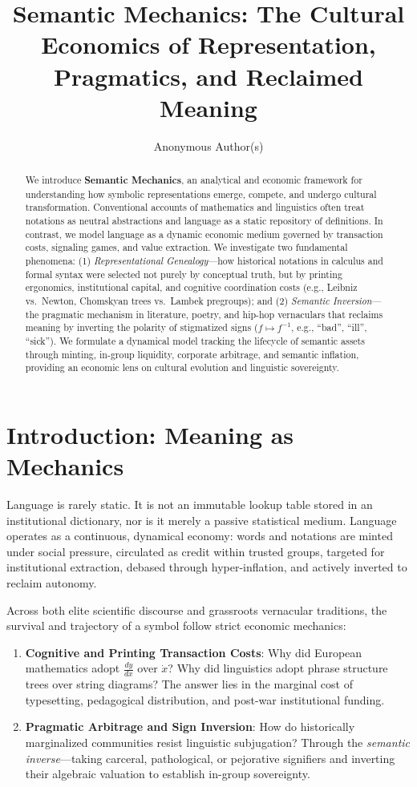 \documentclass[11pt]{article}
\title{\textbf{Semantic Mechanics: The Cultural Economics of Representation, Pragmatics, and Reclaimed Meaning}}
\author{Anonymous Author(s)}
\date{}
\begin{document}
\maketitle

\begin{abstract}
We introduce \textbf{Semantic Mechanics}, an analytical and economic framework for understanding how symbolic representations emerge, compete, and undergo cultural transformation. Conventional accounts of mathematics and linguistics often treat notations as neutral abstractions and language as a static repository of definitions. In contrast, we model language as a dynamic economic medium governed by transaction costs, signaling games, and value extraction. We investigate two fundamental phenomena: (1) \textit{Representational Genealogy}---how historical notations in calculus and formal syntax were selected not purely by conceptual truth, but by printing ergonomics, institutional capital, and cognitive coordination costs (e.g., Leibniz vs.\ Newton, Chomskyan trees vs.\ Lambek pregroups); and (2) \textit{Semantic Inversion}---the pragmatic mechanism in literature, poetry, and hip-hop vernaculars that reclaims meaning by inverting the polarity of stigmatized signs ($f \mapsto f^{-1}$, e.g., ``bad'', ``ill'', ``sick''). We formulate a dynamical model tracking the lifecycle of semantic assets through minting, in-group liquidity, corporate arbitrage, and semantic inflation, providing an economic lens on cultural evolution and linguistic sovereignty.
\end{abstract}

\section{Introduction: Meaning as Mechanics}

Language is rarely static. It is not an immutable lookup table stored in an institutional dictionary, nor is it merely a passive statistical medium. Language operates as a continuous, dynamical economy: words and notations are minted under social pressure, circulated as credit within trusted groups, targeted for institutional extraction, debased through hyper-inflation, and actively inverted to reclaim autonomy.

Across both elite scientific discourse and grassroots vernacular traditions, the survival and trajectory of a symbol follow strict economic mechanics:
\begin{enumerate}
    \item \textbf{Cognitive and Printing Transaction Costs}: Why did European mathematics adopt $\frac{dy}{dx}$ over $\dot{x}$? Why did linguistics adopt phrase structure trees over string diagrams? The answer lies in the marginal cost of typesetting, pedagogical distribution, and post-war institutional funding.
    \item \textbf{Pragmatic Arbitrage and Sign Inversion}: How do historically marginalized communities resist linguistic subjugation? Through the \textit{semantic inverse}---taking carceral, pathological, or pejorative signifiers and inverting their algebraic valuation to establish in-group sovereignty.
\end{enumerate}
\end{document}
